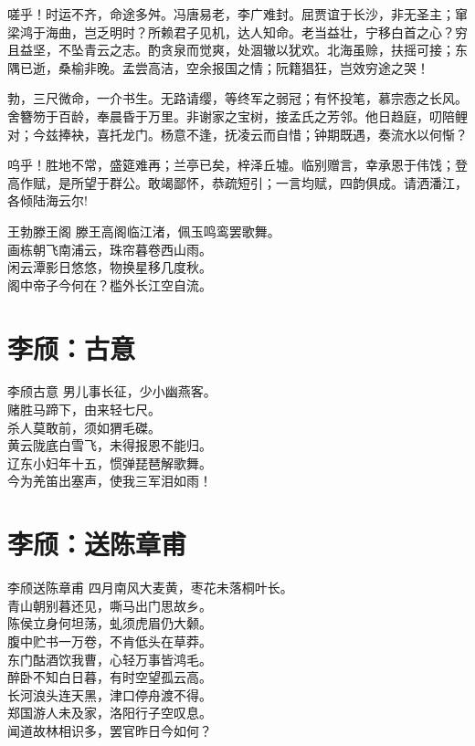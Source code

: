 \documentclass[12pt,oneside,a5paper]{book}
\begin{document}
嗟乎！时运不齐，命途多舛。冯唐易老，李广难封。屈贾谊于长沙，非无圣主；窜梁鸿于海曲，岂乏明时？所赖君子见机，达人知命。老当益壮，宁移白首之心？穷且益坚，不坠青云之志。酌贪泉而觉爽，处涸辙以犹欢。北海虽赊，扶摇可接；东隅已逝，桑榆非晚。孟尝高洁，空余报国之情；阮籍猖狂，岂效穷途之哭！

勃，三尺微命，一介书生。无路请缨，等终军之弱冠；有怀投笔，慕宗悫之长风。舍簪笏于百龄，奉晨昏于万里。非谢家之宝树，接孟氏之芳邻。他日趋庭，叨陪鲤对；今兹捧袂，喜托龙门。杨意不逢，抚凌云而自惜；钟期既遇，奏流水以何惭？

呜乎！胜地不常，盛筵难再；兰亭已矣，梓泽丘墟。临别赠言，幸承恩于伟饯；登高作赋，是所望于群公。敢竭鄙怀，恭疏短引；一言均赋，四韵俱成。请洒潘江，各倾陆海云尔!

\begin{poemzh}{王勃}{滕王阁}
滕王高阁临江渚，佩玉鸣鸾罢歌舞。\\
画栋朝飞南浦云，珠帘暮卷西山雨。\\
闲云潭影日悠悠，物换星移几度秋。\\
阁中帝子今何在？槛外长江空自流。\\
\end{poemzh}

\chapter{李颀：古意}
\begin{poemzh}{李颀}{古意}
男儿事长征，少小幽燕客。\\
赌胜马蹄下，由来轻七尺。\\
杀人莫敢前，须如猬毛磔。\\
黄云陇底白雪飞，未得报恩不能归。\\
辽东小妇年十五，惯弹琵琶解歌舞。\\
今为羌笛出塞声，使我三军泪如雨！\\ 
\end{poemzh}

\chapter{李颀：送陈章甫}
\begin{poemzh}{李颀}{送陈章甫}
四月南风大麦黄，枣花未落桐叶长。\\
青山朝别暮还见，嘶马出门思故乡。\\
陈侯立身何坦荡，虬须虎眉仍大颡。\\
腹中贮书一万卷，不肯低头在草莽。\\
东门酤酒饮我曹，心轻万事皆鸿毛。\\
醉卧不知白日暮，有时空望孤云高。\\
长河浪头连天黑，津口停舟渡不得。\\
郑国游人未及家，洛阳行子空叹息。\\
闻道故林相识多，罢官昨日今如何？\\ 
\end{poemzh}
\end{document}
